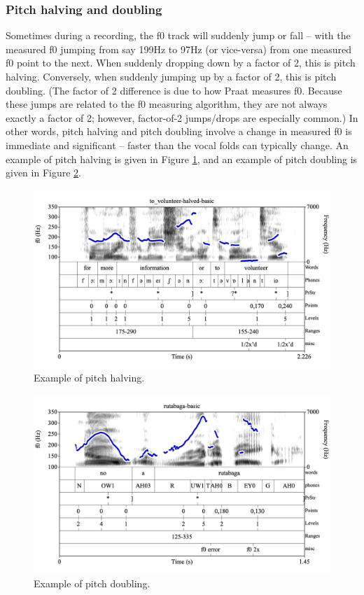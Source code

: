 \documentclass[11pt, twoside]{memoir}
\begin{document}
\subsubsection{Pitch halving and doubling}\label{sec:pitch-halving-and-doubling}
Sometimes during a recording, the f0 track will suddenly jump or fall – with the measured f0 jumping from say 199Hz to 97Hz (or vice-versa) from one measured f0 point to the next. When suddenly dropping down by a factor of 2, this is pitch halving. Conversely, when suddenly jumping up by a factor of 2, this is pitch doubling. (The factor of 2 difference is due to how Praat measures f0. Because these jumps are related to the f0 measuring algorithm, they are not always exactly a factor of 2; however, factor-of-2 jumps\slash drops are especially common.) 
In other words, pitch halving and pitch doubling involve a change in measured f0 is immediate and significant – faster than the vocal folds can typically change. An example of pitch halving is given in Figure \ref{fig:to volunteer-halved f0-tracking}, and an example of pitch doubling is given in Figure \ref{fig:rutabaga f0-tracking}.
\begin{figure}[H]
\centering
\includegraphics[width=.875\linewidth]{Appendix-to_volunteer-halved.png}
\caption{Example of pitch halving.
\label{fig:to volunteer-halved f0-tracking}
}
\end{figure}
\begin{figure}[H]
\centering
\includegraphics[width=.875\linewidth]{Contours-rutabaga-basic.png}
\caption{Example of pitch doubling.
\label{fig:rutabaga f0-tracking}
}
\end{figure}
\end{document}

